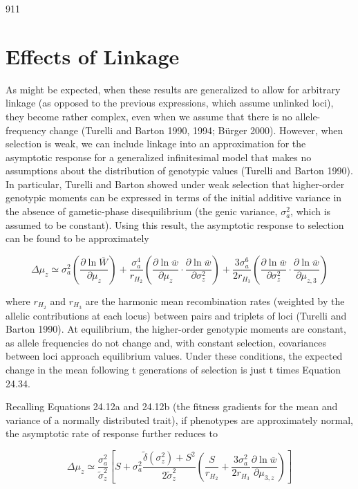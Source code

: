 \documentclass{article}
\begin{document}
911

\section{Effects of Linkage}
As might be expected, when these results are generalized to allow for arbitrary linkage (as opposed to the previous expressions, which assume unlinked loci), they become rather complex, even when we assume that there is no allele-frequency change (Turelli and Barton 1990, 1994; Bürger 2000). However, when selection is weak, we can include linkage into an approximation for the asymptotic response for a generalized infinitesimal model that makes no assumptions about the distribution of genotypic values (Turelli and Barton 1990). In particular, Turelli and Barton showed under weak selection that higher-order genotypic moments can be expressed in terms of the initial additive variance in the absence of gametic-phase disequilibrium (the genic variance,  $ \sigma_{a}^{2} $, which is assumed to be constant). Using this result, the asymptotic response to selection can be found to be approximately

\begin{equation}
\Delta\mu_{z}\simeq\sigma_{a}^{2}\left(\frac{\partial\ln\overline{W}}{\partial\mu_{z}}\right)+\frac{\sigma_{a}^{4}}{r_{H_{2}}}\left(\frac{\partial\ln\overline{w}}{\partial\mu_{z}}\cdot\frac{\partial\ln\overline{w}}{\partial\sigma_{z}^{2}}\right)+\frac{3\sigma_{a}^{6}}{2r_{H_{3}}}\left(\frac{\partial\ln\overline{w}}{\partial\sigma_{z}^{2}}\cdot\frac{\partial\ln\overline{w}}{\partial\mu_{z,3}}\right)
\tag{24.34}
\label{eq:24_34}
\end{equation}

where  $ r_{H_2} $ and  $ r_{H_3} $ are the harmonic mean recombination rates (weighted by the allelic contributions at each locus) between pairs and triplets of loci (Turelli and Barton 1990). At equilibrium, the higher-order genotypic moments are constant, as allele frequencies do not change and, with constant selection, covariances between loci approach equilibrium values. Under these conditions, the expected change in the mean following t generations of selection is just t times Equation 24.34.

Recalling Equations 24.12a and 24.12b (the fitness gradients for the mean and variance of a normally distributed trait), if phenotypes are approximately normal, the asymptotic rate of response further reduces to

\begin{equation}
\Delta\mu_{z}\simeq\frac{\sigma_{a}^{2}}{\widetilde{\sigma}_{z}^{2}}\left[S+\sigma_{a}^{2}\frac{\widetilde{\delta}(\sigma_{z}^{2})+S^{2}}{2\widetilde{\sigma}_{z}^{2}}\left(\frac{S}{r_{H_{2}}}+\frac{3\sigma_{a}^{2}}{2r_{H_{3}}}\frac{\partial\ln\overline{w}}{\partial\mu_{3,z}}\right)\right]
\tag{24.35}
\label{eq:24_35}
\end{equation}
\end{document}
